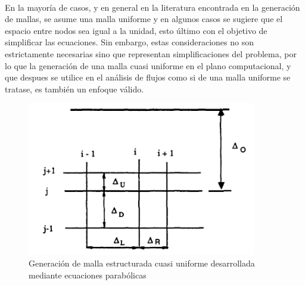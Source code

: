 \documentclass[letterpaper, openright, 12pt]{book}
\begin{document}
    \paragraph*{}
    En la mayoría de casos, y en general en la literatura encontrada en la
    generación de mallas, se asume una malla uniforme y en algunos casos se
    sugiere que el espacio entre nodos sea igual a la unidad, esto último
    con el objetivo de simplificar las ecuaciones. Sin embargo, estas
    consideraciones no son estrictamente necesarias sino que representan
    simplificaciones del problema, por lo que la generación de una malla
    cuasi uniforme en el plano computacional, y que despues se utilice en el
    análisis de flujos como si de una malla uniforme se tratase, es también
    un enfoque válido.
    \begin{figure}[htbp!]
        \centering
        \includegraphics[keepaspectratio, width=100mm]{./Imagenes/parabolic_non_uniform.png}
        \caption[Generación de malla cuasi uniforme por ecuaciones
        parabólicas]{Generación de malla estructurada cuasi uniforme
        desarrollada mediante ecuaciones parabólicas \cite{siladicParabolic}}
        \label{fig:parabolic_non_uniform}
    \end{figure}
\end{document}
